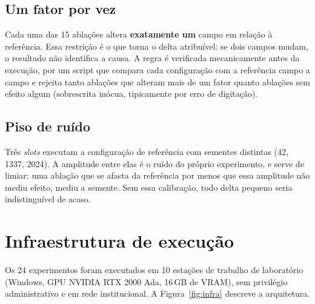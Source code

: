 \documentclass[11pt,a4paper]{article}
\begin{document}
\subsection{Um fator por vez}

Cada uma das 15 ablações altera \textbf{exatamente um} campo em relação à
referência. Essa restrição é o que torna o delta atribuível: se dois campos
mudam, o resultado não identifica a causa. A regra é verificada mecanicamente
antes da execução, por um script que compara cada configuração com a referência
campo a campo e rejeita tanto ablações que alteram mais de um fator quanto
ablações sem efeito algum (sobrescrita inócua, tipicamente por erro de digitação).

\subsection{Piso de ruído}

Três \emph{slots} executam a configuração de referência com sementes distintas
(42, 1337, 2024). A amplitude entre elas é o ruído do próprio experimento, e
serve de limiar: uma ablação que se afasta da referência por menos que essa
amplitude não mediu efeito, mediu a semente. Sem essa calibração, todo delta
pequeno seria indistinguível de acaso.

\section{Infraestrutura de execução}
\label{sec:infra}

Os 24 experimentos foram executados em 10 estações de trabalho de laboratório
(Windows, GPU NVIDIA RTX 2000 Ada, 16\,GB de VRAM), sem privilégio
administrativo e em rede institucional. A Figura~\ref{fig:infra} descreve a
arquitetura.
\end{document}
